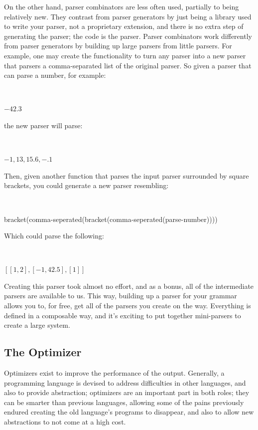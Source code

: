 \documentclass[titlepage]{article}
\begin{document}
			On the other hand, parser combinators are less often used, partially to being relatively new.  They contrast from parser generators by just being a library used to write your parser, not a proprietary extension, and there is no extra step of generating the parser; the code is the parser.  Parser combinators work differently from parser generators by building up large parsers from little parsers.  For example, one may create the functionality to turn any parser into a new parser that parsers a comma-separated list of the original parser.  So given a parser that can parse a number, for example:
			\newline

			~\centerline{$-42.3$}
			\newline

			the new parser will parse:
			\newline

			~\centerline{$-1, 13, 15.6, -.1$}
			\newline

			Then, given another function that parses the input parser surrounded by square brackets, you could generate a new parser resembling:
			\newline

			~\centerline{bracket(comma-seperated(bracket(comma-seperated(parse-number))))}
			\newline

			Which could parse the following:
			\newline

			~\centerline{$[[1, 2], [-1, 42.5], [1]]$}
			\newline

			Creating this parser took almost no effort, and as a bonus, all of the intermediate parsers are available to us.  This way, building up a parser for your grammar allows you to, for free, get all of the parsers you create on the way.  Everything is defined in a composable way, and it's exciting to put together mini-parsers to create a large system.

		\subsection{The Optimizer}

			Optimizers exist to improve the performance of the output.  Generally, a programming language is devised to address difficulties in other languages, and also to provide abstraction; optimizers are an important part in both roles; they can be smarter than previous languages, allowing some of the pains previously endured creating the old language's programs to disappear, and also to allow new abstractions to not come at a high cost.
\end{document}
